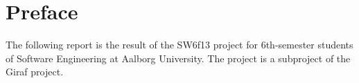 \chapter*{Preface}
The following report is the result of the SW6f13 project for 6th-semester students of Software Engineering at Aalborg University. The project is a subproject of the Giraf project.	